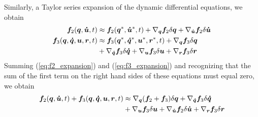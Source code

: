 \documentclass[smallcondensed]{svjour3}                     %
\begin{document}
Similarly, a Taylor series expansion of the dynamic differential equations, we
obtain
\begin{align}
  \label{eq:f2_expansion}
  \bm{f}_{2}(\bm{q}, \bm{\dot{u}}, t) &\approx
      \bm{f}_{2}(\bm{q}^*, \bm{\dot{u}}^*, t) +
      \nabla_{\bm{q}}\bm{f}_{2} \delta\bm{q}
      + \nabla_{\bm{\dot{u}}}\bm{f}_{2} \delta\bm{\dot{u}}\\
  \bm{f}_{3}(\bm{q}, \bm{\dot{q}}, \bm{u}, \bm{r}, t) &\approx
  \bm{f}_{3}(\bm{q}^*, \bm{\dot{q}}^*, \bm{u}^*, \bm{r}^*, t) +
  \nabla_{\bm{q}}\bm{f}_{3} \delta\bm{q}\notag\\
  \label{eq:f3_expansion}
  &+ \nabla_{\bm{\dot{q}}}\bm{f}_{3} \delta\bm{\dot{q}}
  + \nabla_{\bm{u}}\bm{f}_{3} \delta \bm{u}
  + \nabla_{\bm{r}}\bm{f}_{3} \delta\bm{r}
\end{align}
Summing (\ref{eq:f2_expansion}) and (\ref{eq:f3_expansion}) and recognizing
that the sum of the first term on the right hand sides of these equations must
equal zero, we obtain
\begin{align}
  \bm{f}_{2}(\bm{q}, \bm{\dot{u}}, t) + \bm{f}_{3}(\bm{q}, \bm{\dot{q}},
  \bm{u}, \bm{r}, t) &\approx \nabla_{\bm{q}}(\bm{f}_2 + \bm{f}_3)
  \delta\bm{q} + \nabla_{\bm{\dot{q}}}\bm{f}_{3} \delta\bm{\dot{q}}\notag\\
  \label{eq:f2_plus_f3_expansion}
  &+ \nabla_{\bm{u}}\bm{f}_{3} \delta\bm{u} +
  \nabla_{\bm{\dot{u}}}\bm{f}_{2} \delta\bm{\dot{u}} + \nabla_{\bm{r}}\bm{f}_{3} \delta\bm{r}
\end{align}
\end{document}
